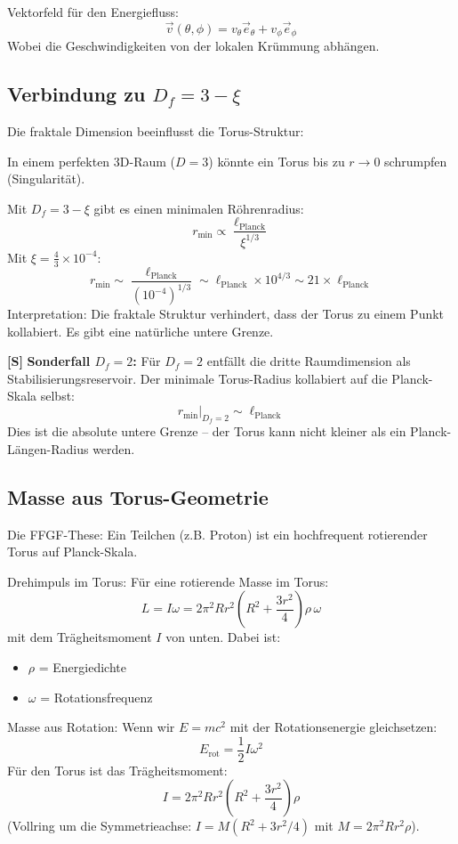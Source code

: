	Vektorfeld für den Energiefluss:
	\[
	\vec{v}(\theta, \phi) = v_\theta \vec{e}_\theta + v_\phi \vec{e}_\phi
	\]
	Wobei die Geschwindigkeiten von der lokalen Krümmung abhängen.
	
	\subsection{Verbindung zu \( D_f = 3 - \xi \)}
	Die fraktale Dimension beeinflusst die Torus-Struktur:
	
	In einem perfekten 3D-Raum (\( D = 3 \)) könnte ein Torus bis zu \( r \to 0 \) schrumpfen (Singularität).
	
	Mit \( D_f = 3 - \xi \) gibt es einen minimalen Röhrenradius:
	\[
	r_{\text{min}} \propto \frac{\ell_{\text{Planck}}}{\xi^{1/3}}
	\]
	Mit \( \xi = \frac{4}{3} \times 10^{-4} \):
	\[
	r_{\text{min}} \sim \frac{\ell_{\text{Planck}}}{(10^{-4})^{1/3}} \sim \ell_{\text{Planck}} \times 10^{4/3} \sim 21 \times \ell_{\text{Planck}}
	\]
	Interpretation: Die fraktale Struktur verhindert, dass der Torus zu einem Punkt kollabiert. Es gibt eine natürliche untere Grenze.

	\textbf{[S]} \textbf{Sonderfall \(D_f = 2\):}
	Für $D_f = 2$ entfällt die dritte Raumdimension als Stabilisierungsreservoir. Der minimale Torus-Radius kollabiert auf die Planck-Skala selbst:
	\[
	r_{\text{min}}\big|_{D_f=2} \sim \ell_{\text{Planck}}
	\]
	Dies ist die absolute untere Grenze – der Torus kann nicht kleiner als ein Planck-Längen-Radius werden.
	
	\subsection{Masse aus Torus-Geometrie}
	Die FFGF-These: Ein Teilchen (z.B. Proton) ist ein hochfrequent rotierender Torus auf Planck-Skala.
	
	Drehimpuls im Torus:
	Für eine rotierende Masse im Torus:
	\[
	L = I\omega = 2\pi^2 R r^2 \left(R^2 + \frac{3r^2}{4}\right) \rho\, \omega
	\]
	mit dem Trägheitsmoment $I$ von unten. Dabei ist:
	\begin{itemize}
		\item \( \rho \) = Energiedichte
		\item \( \omega \) = Rotationsfrequenz
	\end{itemize}
	
	Masse aus Rotation:
	Wenn wir \( E = mc^2 \) mit der Rotationsenergie gleichsetzen:
	\[
	E_{\text{rot}} = \frac{1}{2} I \omega^2
	\]
	Für den Torus ist das Trägheitsmoment:
	\[
	I = 2\pi^2 R r^2 \left(R^2 + \frac{3r^2}{4}\right) \rho
	\]
	(Vollring um die Symmetrieachse: $I = M(R^2 + 3r^2/4)$ mit $M = 2\pi^2 R r^2 \rho$).

